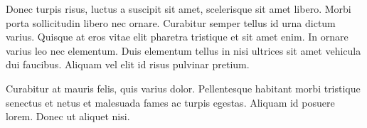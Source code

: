 Donec turpis risus, luctus a suscipit sit amet, scelerisque sit amet libero. Morbi porta sollicitudin libero nec ornare. Curabitur semper tellus id urna dictum varius. Quisque at eros vitae elit pharetra tristique et sit amet enim. In ornare varius leo nec elementum. Duis elementum tellus in nisi ultrices sit amet vehicula dui faucibus. Aliquam vel elit id risus pulvinar pretium. 

Curabitur at mauris felis, quis varius dolor. Pellentesque habitant morbi tristique senectus et netus et malesuada fames ac turpis egestas. Aliquam id posuere lorem. Donec ut aliquet nisi.
